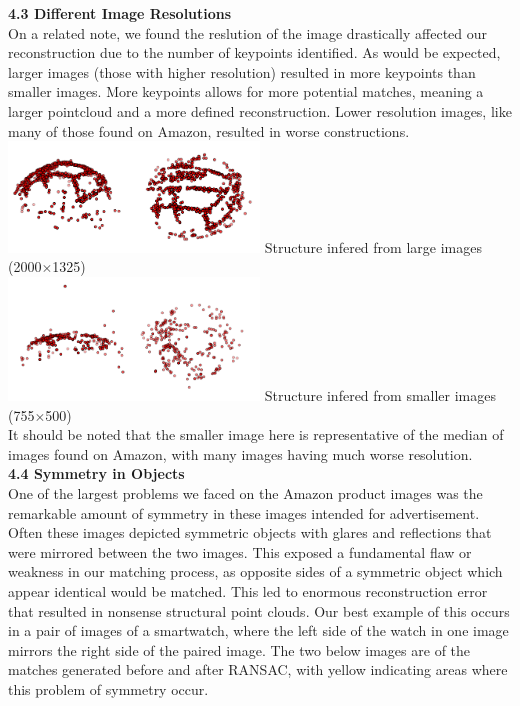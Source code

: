 \documentclass[12pt]{article}
\begin{document}
\begin{multicols}{2}
{\large \textbf{4.3 Different Image Resolutions}}\\
On a related note, we found the reslution of the image drastically affected our reconstruction due to the number of keypoints identified. As would be expected, larger images (those with higher resolution) resulted in more keypoints than smaller images. More keypoints allows for more potential matches, meaning a larger pointcloud and a more defined reconstruction. Lower resolution images, like many of those found on Amazon,  resulted in worse constructions. 
\includegraphics[width=0.5\textwidth]{images/VBallMediumSurf_SideBySide.png}
Structure infered from large images (2000$\times$1325) \\
\includegraphics[width=0.5\textwidth]{images/VBallSmallSurf_SideBySide.png}
Structure infered from smaller images (755$\times$500) \\
It should be noted that the smaller image here is representative of the median of images found on Amazon, with many images having much worse resolution. \\
{\large \textbf{4.4 Symmetry in Objects}}\\
One of the largest problems we faced on the Amazon product images was the remarkable amount of symmetry in these images intended for advertisement. Often these images depicted symmetric objects with glares and reflections that were mirrored between the two images. This exposed a fundamental flaw or weakness in our matching process, as opposite sides of a symmetric object which appear identical would be matched. This led to enormous reconstruction error that resulted in nonsense structural point clouds. Our best example of this occurs in a pair of images of a smartwatch, where the left side of the watch in one image mirrors the right side of the paired image. The two below images are of the matches generated before and after RANSAC, with yellow indicating areas where this problem of symmetry occur.\\

\end{multicols}
\end{document}
